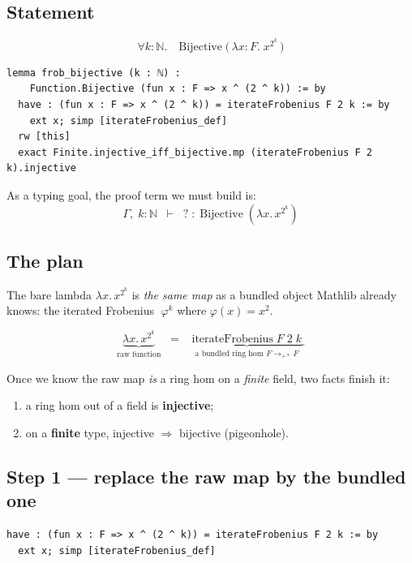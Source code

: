 \documentclass[11pt]{article}
\begin{document}
\subsection*{Statement}

\[
\forall k : \mathbb{N}.\quad
\mathrm{Bijective}\;\bigl(\, \lambda x{:}F.\; x^{2^{k}} \,\bigr)
\]

\begin{lstlisting}
lemma frob_bijective (k : ℕ) :
    Function.Bijective (fun x : F => x ^ (2 ^ k)) := by
  have : (fun x : F => x ^ (2 ^ k)) = iterateFrobenius F 2 k := by
    ext x; simp [iterateFrobenius_def]
  rw [this]
  exact Finite.injective_iff_bijective.mp (iterateFrobenius F 2 k).injective
\end{lstlisting}

As a typing goal, the proof term we must build is:
\[
\Gamma,\; k:\mathbb{N}
\;\;\vdash\;\;
?\;:\;\mathrm{Bijective}\;(\lambda x.\,x^{2^k})
\]

\bigskip
\subsection*{The plan}

The bare lambda $\lambda x.\,x^{2^k}$ is \emph{the same map} as a bundled
object Mathlib already knows: the iterated Frobenius
$\;\varphi^{k}$ where $\varphi(x)=x^{2}$.

\[
\underbrace{\lambda x.\,x^{2^{k}}}_{\text{raw function}}
\;\;=\;\;
\underbrace{\;\mathrm{iterateFrobenius}\;F\;2\;k\;}_{\text{a bundled ring hom } F \to_{+*} F}
\]

Once we know the raw map \emph{is} a ring hom on a \emph{finite} field,
two facts finish it:
\begin{enumerate}\itemsep4pt
  \item a ring hom out of a field is \textbf{injective};
  \item on a \textbf{finite} type, injective $\Rightarrow$ bijective (pigeonhole).
\end{enumerate}

\bigskip
\subsection*{Step 1 --- replace the raw map by the bundled one}

\begin{lstlisting}
have : (fun x : F => x ^ (2 ^ k)) = iterateFrobenius F 2 k := by
  ext x; simp [iterateFrobenius_def]
\end{lstlisting}
\end{document}
